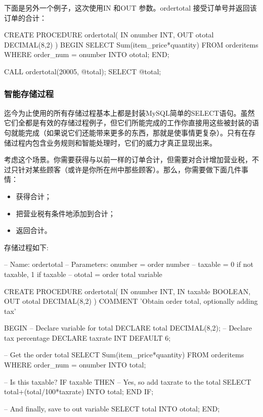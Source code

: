 下面是另外一个例子，这次使用IN 和OUT 参数。ordertotal 接受订单号并返回该订单的合计：

\begin{sql}
CREATE PROCEDURE ordertotal(
    IN onumber INT,
    OUT ototal DECIMAL(8,2)
    )
BEGIN
    SELECT Sum(item_price*quantity)
        FROM orderitems
        WHERE order_num = onumber
        INTO ototal;
END;

CALL ordertotal(20005, @total);
SELECT @total;
\end{sql}

\subsubsection{智能存储过程}

迄今为止使用的所有存储过程基本上都是封装MySQL简单的SELECT语句。虽然它们全都是有效的存储过程例子，但它们所能完成的工作你直接用这些被封装的语句就能完成（如果说它们还能带来更多的东西，那就是使事情更复杂）。只有在存储过程内包含业务规则和智能处理时，它们的威力才真正显现出来。

考虑这个场景。你需要获得与以前一样的订单合计，但需要对合计增加营业税，不过只针对某些顾客（或许是你所在州中那些顾客）。那么，你需要做下面几件事情：

\begin{itemize}
    \item 获得合计；
    \item 把营业税有条件地添加到合计；
    \item 返回合计。
\end{itemize}

存储过程如下:
\begin{sql}
-- Name: ordertotal
-- Parameters: onumber = order number
--             taxable = 0 if not taxable, 1 if taxable
--             ototal = order total variable

CREATE PROCEDURE ordertotal(
    IN onumber INT,
    IN taxable BOOLEAN,
    OUT ototal DECIMAL(8,2)
) COMMENT 'Obtain order total, optionally adding tax'

BEGIN
    -- Declare variable for total
    DECLARE total DECIMAL(8,2);
    -- Declare tax percentage
    DECLARE taxrate INT DEFAULT 6;

    -- Get the order total
    SELECT Sum(item_price*quantity)
        FROM orderitems
        WHERE order_num = onumber
        INTO total;

    -- Is this taxable?
    IF taxable THEN
        -- Yes, so add taxrate to the total
        SELECT total+(total/100*taxrate) INTO total;
    END IF;

    -- And finally, save to out variable
    SELECT total INTO ototal;
END;
\end{sql}

